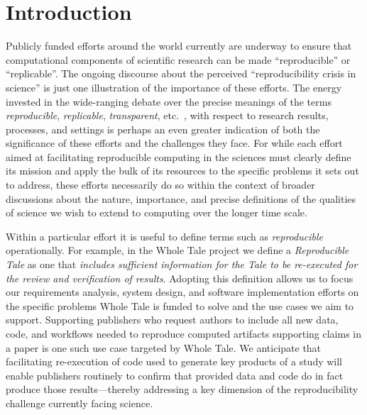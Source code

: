 
\section{Introduction}

Publicly funded efforts around the world currently are underway to 
	ensure that computational components of scientific research
	can be made ``reproducible'' or ``replicable''.
The ongoing discourse about the perceived ``reproducibility crisis in science''
	is just one illustration of the importance of these efforts.
The energy invested in the wide-ranging debate over the precise meanings of the 
	terms \emph{reproducible}, \emph{replicable},
        \emph{transparent}, etc.\
        \cite{drummond2009replicability,carolegoble2016what,freire2016reproducibilitya,goodman2016what,ioannidis2017reproducibility,herouxtoward,plesser2018reproducibility,barba2018terminologies,committeeonreproducibilityandreplicabilityinscience2019reproducibility}, with 
	respect to research results, processes, and settings is perhaps an even greater indication of 
	both the significance of these efforts and the challenges they face.
For while each effort aimed at facilitating reproducible computing in the
	sciences must clearly define its mission and apply the bulk of its resources
	to the specific problems it sets out to address, these efforts necessarily do
	so within the context of broader discussions about the nature, importance,
	and precise definitions of the qualities of science we wish to extend to computing
	over the longer time scale.

Within a particular effort it is useful to define terms such as \emph{reproducible} operationally.
For example, in the Whole Tale project \cite{WT2019,brinckman2019computing} we define a \emph{Reproducible Tale} as one 
	that \emph{includes sufficient information for the Tale to be re-executed for the review 
	and verification of results}.
Adopting this definition allows us to focus our requirements analysis, system design,
	and software implementation efforts on the specific problems Whole Tale is funded to solve
	and the use cases we aim to support.
Supporting publishers who request authors to include all new data, 
	code, and workflows needed to reproduce computed artifacts supporting
	claims in a paper is one such use case targeted by Whole Tale.
We anticipate that facilitating re-execution of code used to generate
	key products of a study will enable publishers routinely to confirm that
	provided data and code do in fact produce those results---thereby addressing
	a key dimension of the reproducibility challenge currently facing science.

